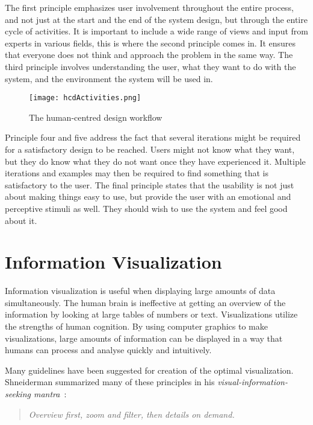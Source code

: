 The first principle emphasizes user involvement throughout the entire process, and not just at the start and the end of the system design, but through the entire cycle of activities. It is important to include a wide range of views and input from experts in various fields, this is where the second principle comes in. It ensures that everyone does not think and approach the problem in the same way. The third principle involves understanding the user, what they want to do with the system, and the environment the system will be used in.

\begin{figure}[h!]
	\centering
		\texttt{[image: hcdActivities.png]}
		\caption[ISO 9241-210 workflow]{The human-centred design workflow}
		\label{fig:hcdActivities}
\end{figure}

Principle four and five address the fact that several iterations might be required for a satisfactory design to be reached. Users might not know what they want, but they do know what they do not want once they have experienced it. Multiple iterations and examples may then be required to find something that is satisfactory to the user. The final principle states that the usability is not just about making things easy to use, but provide the user with an emotional and perceptive stimuli as well. They should wish to use the system and feel good about it.

\section{Information Visualization}
Information visualization is useful when displaying large amounts of data simultaneously. The human brain is ineffective at getting an overview of the information by looking at large tables of numbers or text. Visualizations utilize the strengths of human cognition. By using computer graphics to make visualizations, large amounts of information can be displayed in a way that humans can process and analyse quickly and intuitively.

Many guidelines have been suggested for creation of the optimal visualization. Shneiderman summarized many of these principles in his \emph{visual-information-seeking mantra}~\cite{shneiderman}:

\vspace{-7pt}
\begin{quote}
\textit{Overview first, zoom and filter, then details on demand.}
\end{quote}


